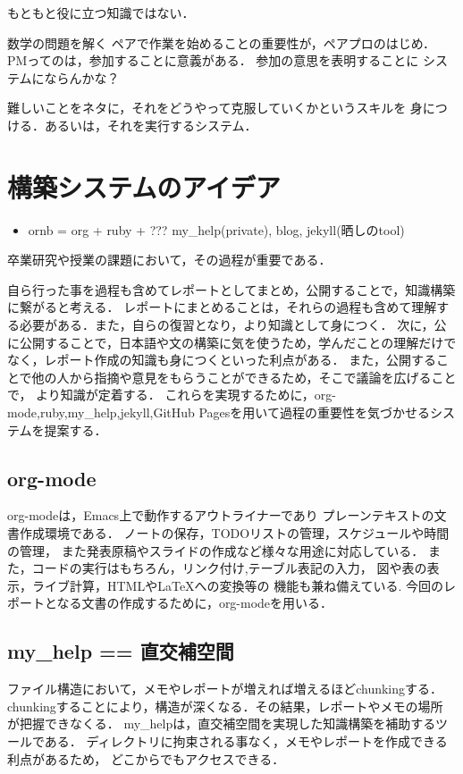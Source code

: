 \documentclass{jsarticle}
\begin{document}
もともと役に立つ知識ではない．

数学の問題を解く
ペアで作業を始めることの重要性が，ペアプロのはじめ．
PMってのは，参加することに意義がある．
参加の意思を表明することに
システムにならんかな？

難しいことをネタに，それをどうやって克服していくかというスキルを
身につける．あるいは，それを実行するシステム．

\section{構築システムのアイデア}
\label{sec:orgf8af29e}
\begin{itemize}
\item ornb = org + ruby + ??? my\_help(private), blog, jekyll(晒しのtool)
\end{itemize}

卒業研究や授業の課題において，その過程が重要である．

自ら行った事を過程も含めてレポートとしてまとめ，公開することで，知識構築に繋がると考える．
レポートにまとめることは，それらの過程も含めて理解する必要がある．また，自らの復習となり，より知識として身につく．
次に，公に公開することで，日本語や文の構築に気を使うため，学んだことの理解だけでなく，レポート作成の知識も身につくといった利点がある．
また，公開することで他の人から指摘や意見をもらうことができるため，そこで議論を広げることで，
より知識が定着する．
これらを実現するために，org-mode,ruby,my\_help,jekyll,GitHub Pagesを用いて過程の重要性を気づかせるシステムを提案する．
\subsection{org-mode}
\label{sec:orgd6861f9}
org-modeは，Emacs上で動作するアウトライナーであり
プレーンテキストの文書作成環境である．
ノートの保存，TODOリストの管理，スケジュールや時間の管理，
また発表原稿やスライドの作成など様々な用途に対応している．
また，コードの実行はもちろん，リンク付け,テーブル表記の入力，
図や表の表示，ライブ計算，HTMLや\LaTeX{}への変換等の
機能も兼ね備えている.
今回のレポートとなる文書の作成するために，org-modeを用いる．

\subsection{my\_help == 直交補空間}
\label{sec:org77a579f}
ファイル構造において，メモやレポートが増えれば増えるほどchunkingする．
chunkingすることにより，構造が深くなる．その結果，レポートやメモの場所
が把握できなくる．
my\_helpは，直交補空間を実現した知識構築を補助するツールである．
ディレクトリに拘束される事なく，メモやレポートを作成できる利点があるため，
どこからでもアクセスできる．
\end{document}
